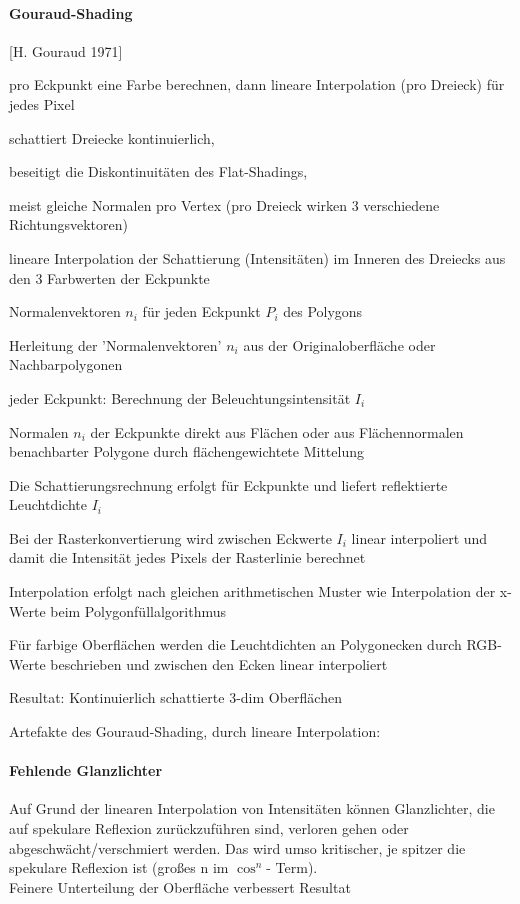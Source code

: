 \documentclass[landscape]{article}
\begin{document}
\begin{multicols}{3}
  \paragraph{Gouraud-Shading}
  [H. Gouraud 1971]
  \begin{itemize*}
    \item pro Eckpunkt eine Farbe berechnen, dann lineare Interpolation (pro Dreieck) für jedes Pixel
    \item schattiert Dreiecke kontinuierlich,
    \item beseitigt die Diskontinuitäten des Flat-Shadings,
    \item meist gleiche Normalen pro Vertex (pro Dreieck wirken 3 verschiedene Richtungsvektoren)
    \item lineare Interpolation der Schattierung (Intensitäten) im Inneren des Dreiecks aus den 3 Farbwerten der Eckpunkte
    \item Normalenvektoren $n_i$ für jeden Eckpunkt $P_i$ des Polygons
    \item Herleitung der 'Normalenvektoren' $n_i$ aus der Originaloberfläche oder Nachbarpolygonen
    \item jeder Eckpunkt: Berechnung der Beleuchtungsintensität $I_i$
    \item Normalen $n_i$ der Eckpunkte direkt aus Flächen oder aus Flächennormalen benachbarter Polygone durch flächengewichtete Mittelung
    \item Die Schattierungsrechnung erfolgt für Eckpunkte und liefert reflektierte Leuchtdichte $I_i$
    \item Bei der Rasterkonvertierung wird zwischen Eckwerte $I_i$ linear interpoliert und damit die Intensität jedes Pixels der Rasterlinie berechnet
    \item Interpolation erfolgt nach gleichen arithmetischen Muster wie Interpolation der x-Werte beim Polygonfüllalgorithmus
    \item Für farbige Oberflächen werden die Leuchtdichten an Polygonecken durch RGB-Werte beschrieben und zwischen den Ecken linear interpoliert
    \item Resultat: Kontinuierlich schattierte 3-dim Oberflächen
  \end{itemize*}
  
  Artefakte des Gouraud-Shading, durch lineare Interpolation:
  
  \paragraph{Fehlende Glanzlichter}
  Auf Grund der linearen Interpolation von Intensitäten können Glanzlichter, die auf spekulare Reflexion zurückzuführen sind, verloren gehen oder abgeschwächt/verschmiert werden. Das wird umso kritischer, je spitzer die spekulare Reflexion ist (großes n im $\cos^n$- Term).\\
  Feinere Unterteilung der Oberfläche verbessert Resultat
  

\end{multicols}
\end{document}
